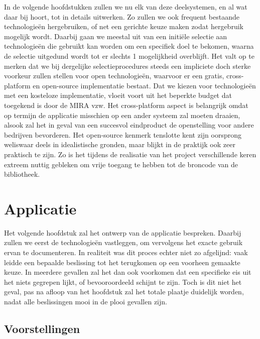 \documentclass[verslag.tex]{subfiles}
\begin{document}
In de volgende hoofdstukken zullen we nu elk van deze deelsystemen, en al wat daar bij hoort, tot in details uitwerken. Zo zullen we ook frequent bestaande technologieën hergebruiken, of net een gerichte keuze maken zodat hergebruik mogelijk wordt. Daarbij gaan we meestal uit van een initiële selectie aan technologieën die gebruikt kan worden om een specifiek doel te bekomen, waarna de selectie uitgedund wordt tot er slechts 1 mogelijkheid overblijft. Het valt op te merken dat we bij dergelijke selectieprocedures steeds een impliciete doch sterke voorkeur zullen stellen voor open technologieën, waarvoor er een gratis, cross-platform en open-source implementatie bestaat. Dat we kiezen voor technologieën met een kosteloze implementatie, vloeit voort uit het beperkte budget dat toegekend is door de MIRA vzw. Het cross-platform aspect is belangrijk omdat op termijn de applicatie misschien op een ander systeem zal moeten draaien, alsook zal het in geval van een succesvol eindproduct de openstelling voor andere bedrijven bevorderen. Het open-source kenmerk tenslotte kent zijn oorsprong weliswaar deels in idealistische gronden, maar blijkt in de praktijk ook zeer praktisch te zijn. Zo is het tijdens de realisatie van het project verschillende keren extreem nuttig gebleken om vrije toegang te hebben tot de broncode van de bibliotheek.


%
%

\chapter{Applicatie}
\label{ontwerp:applicatie}

Het volgende hoofdstuk zal het ontwerp van de applicatie bespreken. Daarbij zullen we eerst de technologieën vastleggen, om vervolgens het exacte gebruik ervan te documenteren. In realiteit was dit proces echter niet zo afgelijnd: vaak leidde een bepaalde beslissing tot het terugkomen op een voorheen gemaakte keuze. In meerdere gevallen zal het dan ook voorkomen dat een specifieke eis uit het niets gegrepen lijkt, of bevooroordeeld schijnt te zijn. Toch is dit niet het geval, pas na afloop van het hoofdstuk zal het totale plaatje duidelijk worden, nadat alle beslissingen mooi in de plooi gevallen zijn.

\section{Voorstellingen}
\label{ontwerp:applicatie:voorstellingen}
\end{document}
